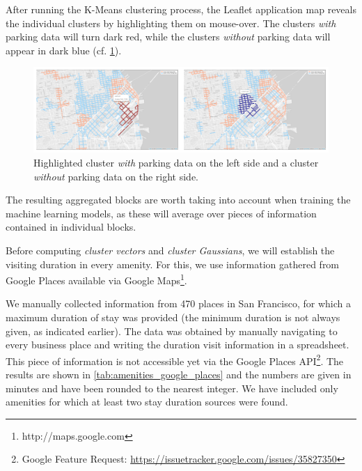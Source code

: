\documentclass{ws-ijait}
\begin{document}
	After running the K-Means clustering process, the Leaflet application map reveals the individual clusters by highlighting them on mouse-over.
	The clusters \textit{with} parking data will turn dark red, while the clusters \textit{without} parking data will appear in dark blue (cf. \cref{fig:highlighted_collage}). 
	
	\begin{figure}[!ht]
		\centering
		\includegraphics[width=\textwidth]{../graphics/highlighted_collage.png}
		\caption{Highlighted cluster \textit{with} parking data on the left side and a cluster \textit{without} parking data on the right side.}
		\label{fig:highlighted_collage}
	\end{figure}
		
	The resulting aggregated blocks are worth taking into account when training the machine learning models, as these will average over pieces of information contained in individual blocks.
	
	Before computing \textit{cluster vectors} and \textit{cluster Gaussians}, we will establish the visiting duration in every amenity.
	For this, we use information gathered from Google Places available via Google Maps\footnote{http://maps.google.com}.
	
	We manually collected information from 470 places in San Francisco, for which a maximum duration of stay was provided (the minimum duration is not always given, as indicated earlier).
	The data was obtained by manually navigating to every business place and writing the duration visit information in a spreadsheet.
	This piece of information is not accessible yet via the Google Places API\footnote{Google Feature Request: \url{https://issuetracker.google.com/issues/35827350}}.
	The results are shown in \cref{tab:amenities_google_places} and the numbers are given in minutes and have been rounded to the nearest integer. We have included only amenities for which at least two stay duration sources were found. 
	
\end{document}
